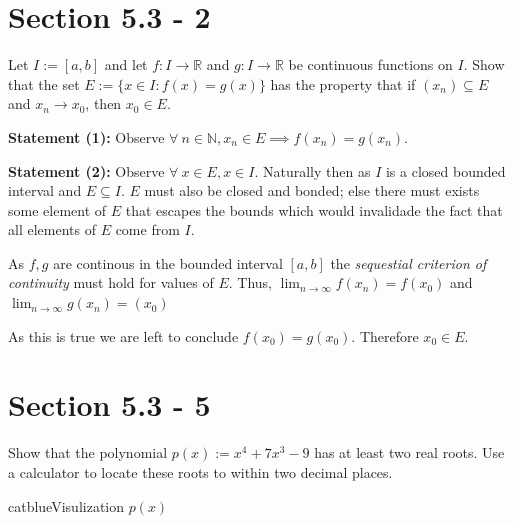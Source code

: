 
\author{Aren Vista}
\date{\today}

\maketitle
\section{Section 5.3 - 2}
Let $I := [a, b]$ and let $f : I \to \mathbb{R}$ and $g : I \to \mathbb{R}$ be continuous functions on $I$. Show that the set $E := \{x \in I : f(x) = g(x)\}$ has the property that if $(x_n) \subseteq E$ and $x_n \to x_0$, then $x_0 \in E$.

\textbf{Statement (1):} Observe $\forall~ n \in \mathbb{N}, x_n \in E \implies f(x_n) = g(x_n)$.

\textbf{Statement (2):} Observe $\forall~ x \in E, x \in I$. Naturally then as $I$ is a closed bounded interval and $E \subseteq I$. $E$ must also be closed and bonded; else there must exists some element of $E$ that escapes the bounds which would invalidade the fact that all elements of $E$ come from $I$.

As $f,g$ are continous in the bounded interval $[a,b]$ the \textit{sequestial criterion of continuity} must hold for values of $E$. Thus, $\lim_{n \to \infty} f(x_n) = f(x_0)$ and $\lim_{n \to \infty} g(x_n) = (x_0)$

As this is true we are left to conclude $f(x_0) = g(x_0)$. Therefore $x_0 \in E$.

\section{Section 5.3 - 5}
Show that the polynomial $p(x) := x^4 + 7x^3 - 9$ has at least two real roots. Use a calculator to locate these roots to within two decimal places.

\begin{cbox}{catblue}{Visulization $p(x)$}
\begin{center}
\end{center}
\end{cbox}

